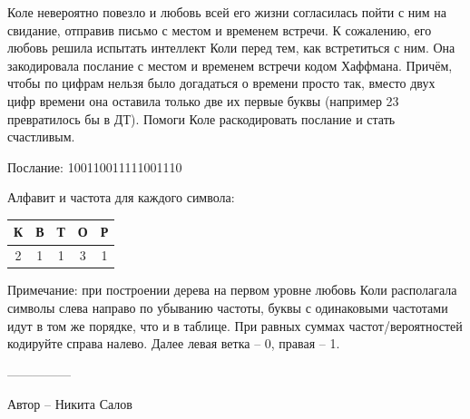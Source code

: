 \question
Коле невероятно повезло и любовь всей его жизни согласилась пойти с ним на свидание, отправив письмо с местом и временем встречи. К сожалению, его любовь решила испытать интеллект Коли перед тем, как встретиться с ним. Она закодировала послание с местом и временем встречи кодом Хаффмана. Причём, чтобы по цифрам нельзя было догадаться о времени просто так, вместо двух цифр времени она оставила только две их первые буквы (например 23 превратилось бы в ДТ). Помоги Коле раскодировать послание и стать счастливым.

  Послание: 100110011111001110 

Алфавит и частота для каждого символа:
\begin{center}
\begin{tabular}{|c|c|c|c|c|}
\hline
К& В& Т& О &Р\\
\hline
2& 1& 1& 3&1\\ \hline
\end{tabular}
\end{center}

Примечание: при построении дерева на первом уровне любовь Коли располагала символы слева направо по убыванию частоты, буквы с одинаковыми частотами идут в том же порядке, что и в таблице. При равных суммах частот/вероятностей кодируйте справа налево. Далее левая ветка – 0, правая – 1.

---------------

Автор -- Никита Салов